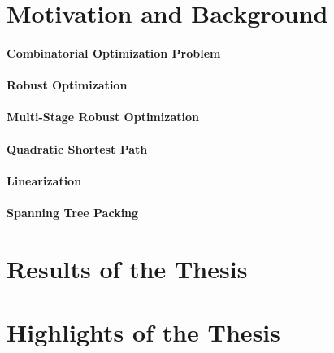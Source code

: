 \section{Motivation and Background}
\label{sec:motivation-background}

\paragraph*{Combinatorial Optimization Problem}

\paragraph*{Robust Optimization}

\paragraph*{Multi-Stage Robust Optimization}

\paragraph*{Quadratic Shortest Path}

\paragraph*{Linearization}

\paragraph*{Spanning Tree Packing}

\section{Results of the Thesis}
\label{sec:thesis-results}

\section{Highlights of the Thesis}
\label{sec:thesis-highlights}